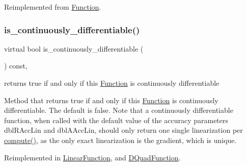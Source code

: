 Reimplemented from \mbox{\hyperlink{class_s_m_spp__di__unipi__it_1_1_function_ae281b6699b0707a5cdc1e82b76d26c09}{Function}}.

\mbox{\label{class_s_m_spp__di__unipi__it_1_1_c05_function_ade71194d2205da239374eeeb8ba82b11}} 
\subsubsection{\texorpdfstring{is\+\_\+continuously\+\_\+differentiable()}{is\_continuously\_differentiable()}}
{\footnotesize\ttfamily virtual bool is\+\_\+continuously\+\_\+differentiable (\begin{DoxyParamCaption}\item[{void}]{ }\end{DoxyParamCaption}) const\hspace{0.3cm}{\ttfamily [inline]}, {\ttfamily [virtual]}}



returns true if and only if this \mbox{\hyperlink{class_s_m_spp__di__unipi__it_1_1_function}{Function}} is continuously differentiable 

Method that returns true if and only if this \mbox{\hyperlink{class_s_m_spp__di__unipi__it_1_1_function}{Function}} is continuously differentiable. The default is false. Note that a continuously differentiable function, when called with the default value of the accuracy parameters dbl\+R\+Acc\+Lin and dbl\+A\+Acc\+Lin, should only return one single linearization per \mbox{\hyperlink{class_s_m_spp__di__unipi__it_1_1_function_a504d4e3e174c7a518cc66156a8a45ce5}{compute()}}, as the only exact linearization is the gradient, which is unique. 

Reimplemented in \mbox{\hyperlink{class_s_m_spp__di__unipi__it_1_1_linear_function_ae8dc9a7225895704afe3802754f4fd75}{Linear\+Function}}, and \mbox{\hyperlink{class_s_m_spp__di__unipi__it_1_1_d_quad_function_ae8dc9a7225895704afe3802754f4fd75}{D\+Quad\+Function}}.

\mbox{\label{class_s_m_spp__di__unipi__it_1_1_c05_function_a59a9fcbf8f9f86d348344b2073644b0e}} 
